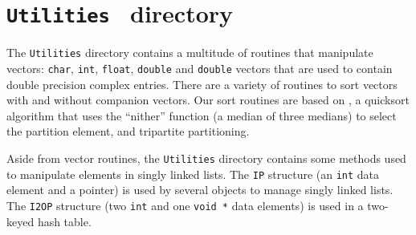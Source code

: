 \chapter{{\tt Utilities } directory }
\label{chapter:Utilities}
\par
The {\tt Utilities} directory contains a multitude of routines that
manipulate vectors: {\tt char}, {\tt int}, {\tt float}, {\tt double}
and {\tt double} vectors that are used to contain double precision
complex entries.
There are a variety of routines to sort vectors with and without
companion vectors. Our sort routines are based on \cite{bent93-sort},
a quicksort algorithm that uses the ``nither'' function (a median
of three medians) to select the partition element, and tripartite
partitioning.
\par
Aside from vector routines, the {\tt Utilities} directory contains
some methods used to manipulate elements in singly linked lists.
The {\tt IP} structure (an {\tt int} data element and a pointer)
is used by several objects to manage singly linked lists.
The {\tt I2OP} structure (two {\tt int} and one {\tt void *} data
elements) is used in a two-keyed hash table.
